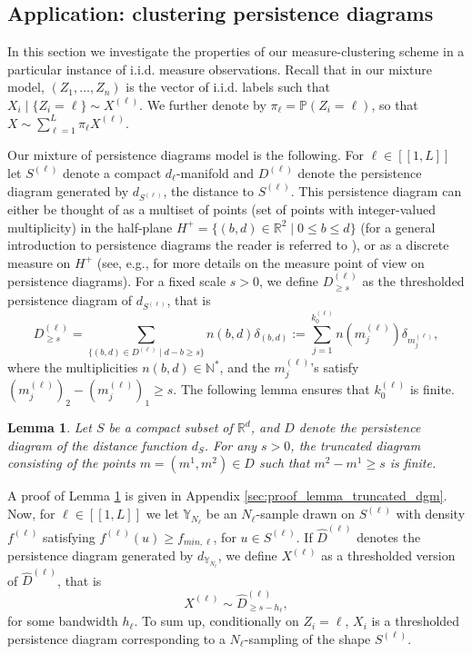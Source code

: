\documentclass[noinfoline,preprint]{article}
\newtheorem{lem}[theorem]{Lemma}
\newcommand{\R}{\mathbb{R}}
\renewcommand{\1}{\mathds 1}
\begin{document}
\subsection{Application: clustering persistence diagrams}\label{sec:appli_PD}

In this section we investigate the properties of our measure-clustering scheme in a particular instance of i.i.d. measure observations. Recall that in our mixture model, $(Z_1, \hdots, Z_n)$ is the vector of i.i.d. labels such that $X_i\mid \{Z_i = \ell\} \sim X^{(\ell)}$. We further denote by $\pi_\ell = \mathbb{P}(Z_i=\ell)$, so that $X \sim \sum_{\ell=1}^L \pi_\ell X^{(\ell)}$.

Our mixture of persistence diagrams model is the following. For $\ell \in [\![1, L]\!]$ let $S^{(\ell)}$ denote a compact $d_\ell$-manifold and $D^{(\ell)}$ denote the persistence diagram generated by $d_{S^{(\ell)}}$, the distance to $S^{(\ell)}$. This persistence diagram can either be  thought of as a multiset of points (set of points with integer-valued multiplicity) in the half-plane $H^+=\{(b,d) \in \R^2\mid 0 \leq b \leq  d \}$ (for a general introduction to persistence diagrams the reader is referred to \cite[Section 11.5]{boissonnat2018geometric}), or as a discrete measure on $H^+$ (see, e.g., \cite{ChazalDivol18} for more details on the measure point of view on persistence diagrams). For a fixed scale $s>0$, we define $D^{(\ell)}_{\geq s}$ as the thresholded persistence diagram of $d_{S^{(\ell)}}$, that is
\[
D^{(\ell)}_{\geq s} = \sum_{\{(b,d) \in D^{(\ell)} \mid d-b \geq s\}}n(b,d)\delta_{(b,d)} := \sum_{j=1}^{k_0^{(\ell)}} n(m_j^{(\ell)}) \delta_{m_j^{(\ell)}},
\] 
where the multiplicities $n(b,d) \in \mathbb{N}^*$, and the $m_j^{(\ell)}$'s satisfy $(m_j^{(\ell)})_2 - (m_j^{(\ell)})_1 \geq s$. The following lemma ensures that $k_0^{(\ell)}$ is finite.
\begin{lem} \label{lemma-truncated-dgm}
Let $S$ be a compact subset of $\R^d$, and $D$ denote the persistence diagram of the distance function $d_S$. For any $s >0$, the truncated diagram consisting of the points $m=(m^1, m^2) \in D$ such that $m^2 - m^1 \geq s$ is finite.    
\end{lem}
      
A proof of Lemma \ref{lemma-truncated-dgm} is given in Appendix \ref{sec:proof_lemma_truncated_dgm}. 
Now, for $\ell \in [\![1,L]\!]$ we let $\mathbb{Y}_{N_\ell}$ be an $N_\ell$-sample drawn on $S^{(\ell)}$ with density $f^{(\ell)}$ satisfying $f^{(\ell)}(u) \geq f_{min,\ell}$, for $u \in S^{(\ell)}$. If $\hat{D}^{(\ell)}$ denotes the persistence diagram generated by $d_{\mathbb{Y}_{N_\ell}}$, we define $X^{(\ell)}$ as a thresholded version of $\hat{D}^{(\ell)}$, that is
\[
X^{(\ell)} \sim \hat{D}^{(\ell)}_{\geq s-h_\ell},
\]
for some bandwidth $h_\ell$. To sum up, conditionally on $Z_i=\ell$, $X_i$ is a thresholded persistence diagram corresponding to a $N_\ell$-sampling of the shape $S^{(\ell)}$.
\end{document}
